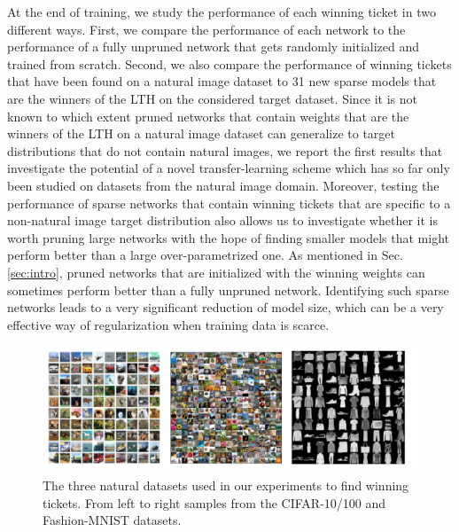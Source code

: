 At the end of training, we study the performance of each winning ticket in two different ways. First, we compare the performance of each network to the performance of a fully unpruned network that gets randomly initialized and trained from scratch. Second, we also compare the performance of winning tickets that have been found on a natural image dataset to 31 new sparse models that are the winners of the LTH on the considered target dataset. Since it is not known to which extent pruned networks that contain weights that are the winners of the LTH on a natural image dataset can generalize to target distributions that do not contain natural images, we report the first results that investigate the potential of a novel transfer-learning scheme which has so far only been studied on datasets from the natural image domain. Moreover, testing the performance of sparse networks that contain winning tickets that are specific to a non-natural image target distribution also allows us to investigate whether it is worth pruning large networks with the hope of finding smaller models that might perform better than a large over-parametrized one. As mentioned in Sec. \ref{sec:intro}, pruned networks that are initialized with the winning weights can sometimes perform better than a fully unpruned network. Identifying such sparse networks leads to a very significant reduction of model size, which can be a very effective way of regularization when training data is scarce.

\begin{figure}
  \centering
   \includegraphics[width=\linewidth,height=\textheight,keepaspectratio]{./Images/Chapter06/natural_datasets.png}
   \caption{The three natural datasets used in our experiments to find winning tickets. From left to right samples from the CIFAR-10/100 and Fashion-MNIST datasets.}
\label{fig:natural_source_datasets}
\end{figure}


